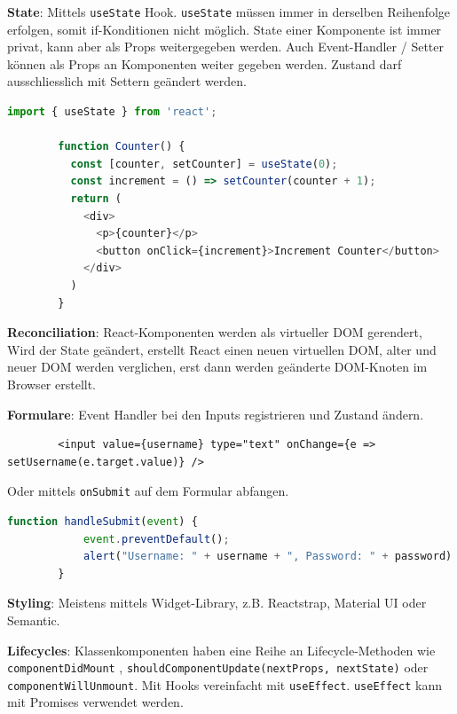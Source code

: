 \documentclass[10pt,landscape]{article}
\begin{document}
\begin{multicols}{2}
        \textbf{State}: Mittels \lstinline{useState} Hook.
        \lstinline{useState} müssen immer in derselben Reihenfolge erfolgen, somit if-Konditionen nicht möglich.
        State einer Komponente ist immer privat, kann aber als Props weitergegeben werden.
        Auch Event-Handler / Setter können als Props an Komponenten weiter gegeben werden.
        Zustand darf ausschliesslich mit Settern geändert werden.

        \begin{lstlisting}[language=JavaScript]
        import { useState } from 'react';

        function Counter() {
          const [counter, setCounter] = useState(0);
          const increment = () => setCounter(counter + 1);
          return (
            <div>
              <p>{counter}</p>
              <button onClick={increment}>Increment Counter</button>
            </div>
          )
        }
        \end{lstlisting}

        \textbf{Reconciliation}: React-Komponenten werden als virtueller DOM gerendert, Wird der State geändert, erstellt React einen neuen virtuellen DOM, alter und neuer DOM werden verglichen, erst dann werden geänderte DOM-Knoten im Browser erstellt.

        \textbf{Formulare}: Event Handler bei den Inputs registrieren und Zustand ändern.

        \begin{lstlisting}
        <input value={username} type="text" onChange={e => setUsername(e.target.value)} />
        \end{lstlisting}

        Oder mittels \lstinline{onSubmit} auf dem Formular abfangen.

        \begin{lstlisting}[language=JavaScript]
        function handleSubmit(event) {
            event.preventDefault();
            alert("Username: " + username + ", Password: " + password)
        }
        \end{lstlisting}

        \textbf{Styling}: Meistens mittels Widget-Library, z.B. Reactstrap, Material UI oder Semantic.

        \textbf{Lifecycles}: Klassenkomponenten haben eine Reihe an Lifecycle-Methoden wie \lstinline{componentDidMount} , \lstinline{shouldComponentUpdate(nextProps, nextState)} oder \lstinline{componentWillUnmount}.
        Mit Hooks vereinfacht mit \lstinline{useEffect}.
        \lstinline{useEffect} kann mit Promises verwendet werden.


\end{multicols}
\end{document}
